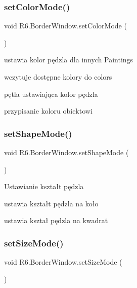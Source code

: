 \subsubsection{\texorpdfstring{setColorMode()}{setColorMode()}}
{\footnotesize\ttfamily void R6.\+Border\+Window.\+set\+Color\+Mode (\begin{DoxyParamCaption}{ }\end{DoxyParamCaption})\hspace{0.3cm}{\ttfamily [private]}}



ustawia kolor pędzla dla innych Paintings 

wczytuje dostępne kolory do colors 

pętla ustawiająca kolor pędzla 

przypisanie koloru obiektowi \mbox{\label{class_r6_1_1_border_window_aa08320545cc38a532d0aad8ed405089d}} 
\subsubsection{\texorpdfstring{setShapeMode()}{setShapeMode()}}
{\footnotesize\ttfamily void R6.\+Border\+Window.\+set\+Shape\+Mode (\begin{DoxyParamCaption}{ }\end{DoxyParamCaption})\hspace{0.3cm}{\ttfamily [private]}}



Ustawianie kształt pędzla 

ustawia kształt pędzla na koło 

ustawia kształ pędzla na kwadrat \mbox{\label{class_r6_1_1_border_window_af993f71d154c141cd4b686ca4e85a1d6}} 
\subsubsection{\texorpdfstring{setSizeMode()}{setSizeMode()}}
{\footnotesize\ttfamily void R6.\+Border\+Window.\+set\+Size\+Mode (\begin{DoxyParamCaption}{ }\end{DoxyParamCaption})\hspace{0.3cm}{\ttfamily [private]}}



